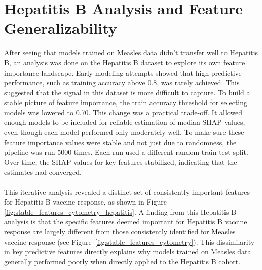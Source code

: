 \documentclass[12pt,a4paper]{report}
\begin{document}
\section{Hepatitis B Analysis and Feature Generalizability}
\noindent
After seeing that models trained on Measles data didn’t transfer well to Hepatitis B, an analysis was done on the Hepatitis B dataset to explore its own feature importance landscape. Early modeling attempts showed that high predictive performance, such as training accuracy above 0.8, was rarely achieved. This suggested that the signal in this dataset is more difficult to capture. To build a stable picture of feature importance, the train accuracy threshold for selecting models was lowered to 0.70. This change was a practical trade-off. It allowed enough models to be included for reliable estimation of median SHAP values, even though each model performed only moderately well. To make sure these feature importance values were stable and not just due to randomness, the pipeline was run 5000 times. Each run used a different random train-test split. Over time, the SHAP values for key features stabilized, indicating that the estimates had converged.\\
\\
This iterative analysis revealed a distinct set of consistently important features for Hepatitis B vaccine response, as shown in Figure \ref{fig:stable_features_cytometry_hepatitis}. A finding from this Hepatitis B analysis is that the specific features deemed important for Hepatitis B vaccine response are largely different from those consistently identified for Measles vaccine response (see Figure~\ref{fig:stable_features_cytometry}). This dissimilarity in key predictive features directly explains why models trained on Measles data generally performed poorly when directly applied to the Hepatitis B cohort.
\end{document}
